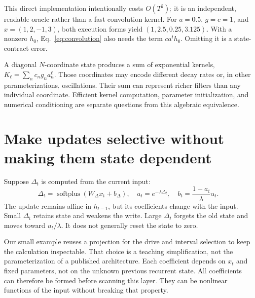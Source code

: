 
This direct implementation intentionally costs $O(T^2)$; it is an
independent, readable oracle rather than a fast convolution kernel.
For $a=0.5$, $g=c=1$, and $x=(1,2,-1,3)$, both execution forms yield
$(1,2.5,0.25,3.125)$. With a nonzero $h_0$, Eq.~\ref{eq:convolution}
also needs the term $ca^t h_0$. Omitting it is a state-contract error.


A diagonal $N$-coordinate state produces a sum of exponential kernels,
$K_\ell=\sum_n c_n g_n a_n^\ell$. Those coordinates may encode different
decay rates or, in other parameterizations, oscillations. Their sum
can represent richer filters than any individual coordinate.
Efficient kernel computation, parameter initialization, and numerical
conditioning are separate questions from this algebraic equivalence.

\section{Make updates selective without making them state dependent}

Suppose $\Delta_t$ is computed from the current input:
\begin{equation}
 \Delta_t=\operatorname{softplus}(W_\Delta x_t+b_\Delta),
 \quad a_t=e^{-\lambda\Delta_t},
 \quad b_t=\frac{1-a_t}{\lambda}u_t.
\end{equation}
The update remains affine in $h_{t-1}$, but its coefficients change with
the input. Small $\Delta_t$ retains state and weakens the write.
Large $\Delta_t$ forgets the old state and moves toward $u_t/\lambda$.
It does not generally reset the state to zero.


Our small example reuses a projection for the drive and interval selection
to keep the calculation inspectable. That choice is a teaching simplification,
not the parameterization of a published architecture. Each coefficient
depends on $x_t$ and fixed parameters, not on the unknown previous recurrent
state. All coefficients can therefore be formed before scanning this layer.
They can be nonlinear functions of the input without breaking that property.

